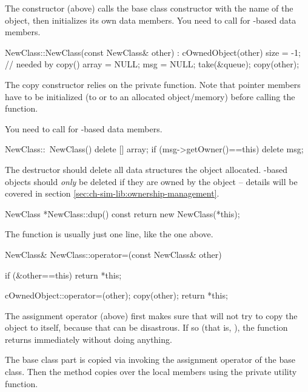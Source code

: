 The constructor (above) calls the base class constructor with
the name of the object, then initializes its own data members.
You need to call  for -based data members.

\begin{cpp}
NewClass::NewClass(const NewClass& other) : cOwnedObject(other)
{
    size = -1; // needed by copy()
    array = NULL;
    msg = NULL;
    take(&queue);
    copy(other);
}
\end{cpp}

The copy constructor relies on the private  function.
Note that pointer members have to be initialized (to  or to an
allocated object/memory) before calling the  function.

You need to call  for -based data members.

\begin{cpp}
NewClass::~NewClass()
{
    delete [] array;
    if (msg->getOwner()==this)
        delete msg;
}
\end{cpp}

The destructor should delete all data structures the object allocated.
-based objects should \textit{only} be deleted if they
are owned by the object -- details will be covered in section
\ref{sec:ch-sim-lib:ownership-management}.

\begin{cpp}
NewClass *NewClass::dup() const
{
    return new NewClass(*this);
}
\end{cpp}

The  function  is usually just one line, like the one above.

\begin{cpp}
NewClass& NewClass::operator=(const NewClass& other)
{
    if (&other==this)
        return *this;

    cOwnedObject::operator=(other);
    copy(other);
    return *this;
}
\end{cpp}

The assignment operator (above) first makes sure that will not try to copy
the object to itself, because that can be disastrous. If so (that is,
), the function returns immediately without doing anything.

The base class part is copied via invoking the assignment operator of
the base class. Then the method copies over the local members using the
 private utility function.

